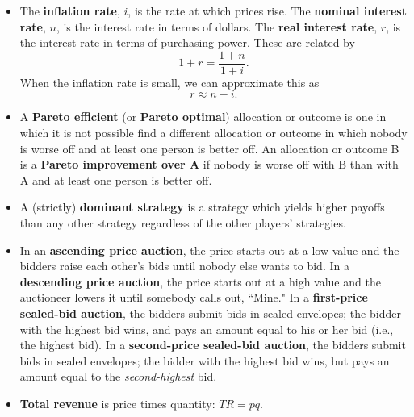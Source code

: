 \documentclass{article}
\begin{document}
\begin{EXAM}
\begin{itemize}
\item The \textbf{inflation rate}, $i$, is the rate at which prices rise. The \textbf{nominal interest rate}, $n$, is the interest rate in terms of dollars. The \textbf{real interest rate}, $r$, is the interest rate in terms of purchasing power. These are related by
\[
1+r=\frac{1+n}{1+i}.
\]
When the inflation rate is small, we can approximate this as
\[
r \approx n-i.
\]


\item A \textbf{Pareto efficient} (or \textbf{Pareto optimal})
allocation or outcome is one in which it is not possible find a
different allocation or outcome in which nobody is worse off and
at least one person is better off. An allocation or outcome B is a
\textbf{Pareto improvement over A} if nobody is worse off with B
than with A and at least one person is better off.

\item A (strictly) \textbf{dominant strategy} is a strategy which yields higher payoffs than any other strategy regardless of the other players' strategies. %


\item In an \textbf{ascending price auction}, the price starts out at a low value and the bidders raise each other's bids until nobody else wants to bid. In a \textbf{descending price auction}, the price starts out at a high value and the auctioneer lowers it until somebody calls out, ``Mine." In a \textbf{first-price sealed-bid auction}, the bidders submit bids in sealed envelopes; the bidder with the highest bid wins, and pays an amount equal to his or her bid (i.e., the highest bid). In a \textbf{second-price sealed-bid auction}, the bidders submit bids in sealed envelopes; the bidder with the highest bid wins, but pays an amount equal to the \emph{second-highest} bid.



\item \textbf{Total revenue} is price times quantity: $TR = pq$.


\end{itemize}
\end{EXAM}
\end{document}
